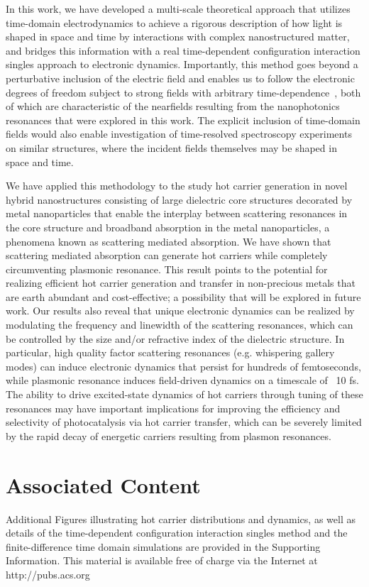 \documentclass[journal=jpclcd,manuscript=article]{achemso}
\begin{document}
In this work, we have developed a multi-scale theoretical approach that utilizes time-domain electrodynamics to achieve a rigorous description of how light is shaped in space and time by interactions with complex nanostructured matter, and bridges this information with a real time-dependent configuration interaction singles approach to electronic dynamics.  Importantly, this method goes beyond a perturbative inclusion of the electric field and enables us to follow the electronic degrees of freedom subject to strong fields with arbitrary time-dependence~\cite{KKS_JCP_2005,GHP_PRA_2010,DPG_PRL_2011}, both of which are characteristic of the nearfields resulting from the nanophotonics resonances that were explored in this work.  The explicit inclusion of time-domain fields would also enable investigation of time-resolved spectroscopy experiments on similar structures, where the incident fields themselves may be shaped in space and time.  

We have applied this methodology to the study hot carrier generation in novel hybrid nanostructures consisting of large dielectric core structures decorated by metal nanoparticles that enable the interplay between scattering resonances in the core structure and broadband absorption in the metal nanoparticles, a phenomena known as scattering mediated absorption.  We have shown that scattering mediated absorption can generate hot carriers while completely circumventing plasmonic resonance.  This result points to the potential for realizing efficient hot carrier generation and transfer in non-precious metals that are earth abundant and cost-effective; a possibility that will be explored in future work.   Our results also reveal that unique electronic dynamics can be realized by modulating the frequency and linewidth of the scattering resonances, which can be controlled by the size and/or refractive index of the dielectric structure.  In particular, high quality factor scattering resonances (e.g. whispering gallery modes) can induce electronic dynamics that persist for hundreds of femtoseconds, while plasmonic resonance induces field-driven dynamics on a timescale of ~10 fs.  The ability to drive excited-state dynamics of hot carriers through tuning of these resonances may have important implications for improving the efficiency and selectivity of photocatalysis via hot carrier transfer, which can be severely limited by the rapid decay of energetic carriers resulting from plasmon resonances.

\section{Associated Content}
Additional Figures illustrating hot carrier distributions and dynamics, as well as details of the time-dependent
configuration interaction singles method and the finite-difference time domain simulations are provided in the Supporting 
Information.  This material is available free of charge via the Internet at http://pubs.acs.org
\end{document}
